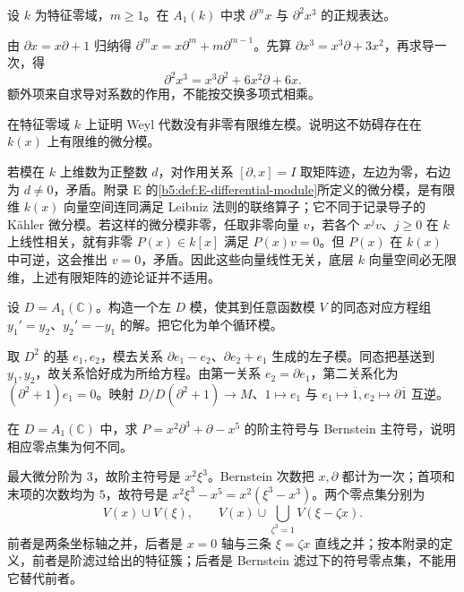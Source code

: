 \BookExercises

\begin{exercise}
	设 \(k\) 为特征零域，\(m\ge1\)。在 \(A_1(k)\) 中求 \(\partial^m x\) 与 \(\partial^2x^3\) 的正规表达。
\end{exercise}
\begin{solution}
	由 \(\partial x=x\partial+1\) 归纳得 \(\partial^m x=x\partial^m+m\partial^{m-1}\)。先算 \(\partial x^3=x^3\partial+3x^2\)，再求导一次，得
	\[
		\partial^2x^3=x^3\partial^2+6x^2\partial+6x.
	\]
	额外项来自求导对系数的作用，不能按交换多项式相乘。
\end{solution}

\begin{exercise}
	在特征零域 \(k\) 上证明 Weyl 代数没有非零有限维左模。说明这不妨碍存在在 \(k(x)\) 上有限维的微分模。
\end{exercise}
\begin{solution}
	若模在 \(k\) 上维数为正整数 \(d\)，对作用关系 \([\partial,x]=I\) 取矩阵迹，左边为零，右边为 \(d\ne0\)，矛盾。附录 E 的\cref{b5:def:E-differential-module}所定义的微分模，是有限维 \(k(x)\) 向量空间连同满足 Leibniz 法则的联络算子；它不同于记录导子的 Kähler 微分模。若这样的微分模非零，任取非零向量 \(v\)，若各个 \(x^jv\)、\(j\ge0\) 在 \(k\) 上线性相关，就有非零 \(P(x)\in k[x]\) 满足 \(P(x)v=0\)。但 \(P(x)\) 在 \(k(x)\) 中可逆，这会推出 \(v=0\)，矛盾。因此这些向量线性无关，底层 \(k\) 向量空间必无限维，上述有限矩阵的迹论证并不适用。
\end{solution}

\begin{exercise}
	设 \(D=A_1(\mathbb C)\)。构造一个左 \(D\) 模，使其到任意函数模 \(V\) 的同态对应方程组 \(y_1'=y_2\)、\(y_2'=-y_1\) 的解。把它化为单个循环模。
\end{exercise}
\begin{solution}
	取 \(D^2\) 的基 \(e_1,e_2\)，模去关系 \(\partial e_1-e_2\)、\(\partial e_2+e_1\) 生成的左子模。同态把基送到 \(y_1,y_2\)，故关系恰好成为所给方程。由第一关系 \(e_2=\partial e_1\)，第二关系化为 \((\partial^2+1)e_1=0\)。映射 \(D/D(\partial^2+1)\to M\)、\(1\mapsto e_1\) 与 \(e_1\mapsto\overline1,e_2\mapsto\partial\overline1\) 互逆。
\end{solution}

\begin{exercise}
	在 \(D=A_1(\mathbb C)\) 中，求 \(P=x^2\partial^3+\partial-x^5\) 的阶主符号与 Bernstein 主符号，说明相应零点集为何不同。
\end{exercise}
\begin{solution}
	最大微分阶为 \(3\)，故阶主符号是 \(x^2\xi^3\)。Bernstein 次数把 \(x,\partial\) 都计为一次；首项和末项的次数均为 \(5\)，故符号是 \(x^2\xi^3-x^5=x^2(\xi^3-x^3)\)。两个零点集分别为
	\[
		V(x)\cup V(\xi),\qquad V(x)\cup\bigcup_{\zeta^3=1}V(\xi-\zeta x).
	\]
	前者是两条坐标轴之并，后者是 \(x=0\) 轴与三条 \(\xi=\zeta x\) 直线之并；按本附录的定义，前者是阶滤过给出的特征簇；后者是 Bernstein 滤过下的符号零点集，不能用它替代前者。
\end{solution}

